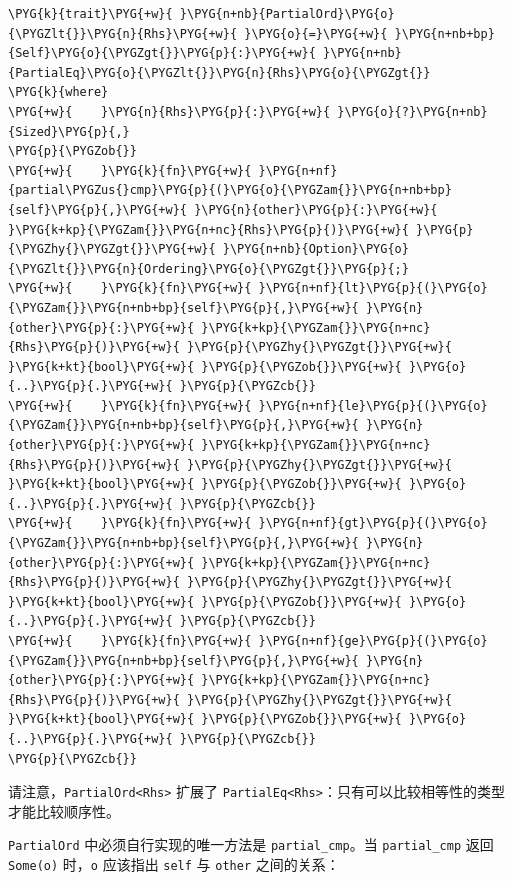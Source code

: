 \begin{Verbatim}[commandchars=\\\{\},breaklines=true,breakanywhere=true,fontsize=\codefont,xleftmargin=17bp]
\PYG{k}{trait}\PYG{+w}{ }\PYG{n+nb}{PartialOrd}\PYG{o}{\PYGZlt{}}\PYG{n}{Rhs}\PYG{+w}{ }\PYG{o}{=}\PYG{+w}{ }\PYG{n+nb+bp}{Self}\PYG{o}{\PYGZgt{}}\PYG{p}{:}\PYG{+w}{ }\PYG{n+nb}{PartialEq}\PYG{o}{\PYGZlt{}}\PYG{n}{Rhs}\PYG{o}{\PYGZgt{}}
\PYG{k}{where}
\PYG{+w}{    }\PYG{n}{Rhs}\PYG{p}{:}\PYG{+w}{ }\PYG{o}{?}\PYG{n+nb}{Sized}\PYG{p}{,}
\PYG{p}{\PYGZob{}}
\PYG{+w}{    }\PYG{k}{fn}\PYG{+w}{ }\PYG{n+nf}{partial\PYGZus{}cmp}\PYG{p}{(}\PYG{o}{\PYGZam{}}\PYG{n+nb+bp}{self}\PYG{p}{,}\PYG{+w}{ }\PYG{n}{other}\PYG{p}{:}\PYG{+w}{ }\PYG{k+kp}{\PYGZam{}}\PYG{n+nc}{Rhs}\PYG{p}{)}\PYG{+w}{ }\PYG{p}{\PYGZhy{}\PYGZgt{}}\PYG{+w}{ }\PYG{n+nb}{Option}\PYG{o}{\PYGZlt{}}\PYG{n}{Ordering}\PYG{o}{\PYGZgt{}}\PYG{p}{;}
\PYG{+w}{    }\PYG{k}{fn}\PYG{+w}{ }\PYG{n+nf}{lt}\PYG{p}{(}\PYG{o}{\PYGZam{}}\PYG{n+nb+bp}{self}\PYG{p}{,}\PYG{+w}{ }\PYG{n}{other}\PYG{p}{:}\PYG{+w}{ }\PYG{k+kp}{\PYGZam{}}\PYG{n+nc}{Rhs}\PYG{p}{)}\PYG{+w}{ }\PYG{p}{\PYGZhy{}\PYGZgt{}}\PYG{+w}{ }\PYG{k+kt}{bool}\PYG{+w}{ }\PYG{p}{\PYGZob{}}\PYG{+w}{ }\PYG{o}{..}\PYG{p}{.}\PYG{+w}{ }\PYG{p}{\PYGZcb{}}
\PYG{+w}{    }\PYG{k}{fn}\PYG{+w}{ }\PYG{n+nf}{le}\PYG{p}{(}\PYG{o}{\PYGZam{}}\PYG{n+nb+bp}{self}\PYG{p}{,}\PYG{+w}{ }\PYG{n}{other}\PYG{p}{:}\PYG{+w}{ }\PYG{k+kp}{\PYGZam{}}\PYG{n+nc}{Rhs}\PYG{p}{)}\PYG{+w}{ }\PYG{p}{\PYGZhy{}\PYGZgt{}}\PYG{+w}{ }\PYG{k+kt}{bool}\PYG{+w}{ }\PYG{p}{\PYGZob{}}\PYG{+w}{ }\PYG{o}{..}\PYG{p}{.}\PYG{+w}{ }\PYG{p}{\PYGZcb{}}
\PYG{+w}{    }\PYG{k}{fn}\PYG{+w}{ }\PYG{n+nf}{gt}\PYG{p}{(}\PYG{o}{\PYGZam{}}\PYG{n+nb+bp}{self}\PYG{p}{,}\PYG{+w}{ }\PYG{n}{other}\PYG{p}{:}\PYG{+w}{ }\PYG{k+kp}{\PYGZam{}}\PYG{n+nc}{Rhs}\PYG{p}{)}\PYG{+w}{ }\PYG{p}{\PYGZhy{}\PYGZgt{}}\PYG{+w}{ }\PYG{k+kt}{bool}\PYG{+w}{ }\PYG{p}{\PYGZob{}}\PYG{+w}{ }\PYG{o}{..}\PYG{p}{.}\PYG{+w}{ }\PYG{p}{\PYGZcb{}}
\PYG{+w}{    }\PYG{k}{fn}\PYG{+w}{ }\PYG{n+nf}{ge}\PYG{p}{(}\PYG{o}{\PYGZam{}}\PYG{n+nb+bp}{self}\PYG{p}{,}\PYG{+w}{ }\PYG{n}{other}\PYG{p}{:}\PYG{+w}{ }\PYG{k+kp}{\PYGZam{}}\PYG{n+nc}{Rhs}\PYG{p}{)}\PYG{+w}{ }\PYG{p}{\PYGZhy{}\PYGZgt{}}\PYG{+w}{ }\PYG{k+kt}{bool}\PYG{+w}{ }\PYG{p}{\PYGZob{}}\PYG{+w}{ }\PYG{o}{..}\PYG{p}{.}\PYG{+w}{ }\PYG{p}{\PYGZcb{}}
\PYG{p}{\PYGZcb{}}
\end{Verbatim}

请注意，\texttt{PartialOrd<Rhs>} 扩展了 \texttt{PartialEq<Rhs>}：只有可以比较相等性的类型才能比较顺序性。

\texttt{PartialOrd} 中必须自行实现的唯一方法是 \texttt{partial\_cmp}。当 \texttt{partial\_cmp} 返回 \texttt{Some(o)} 时，\texttt{o} 应该指出 \texttt{self} 与 \texttt{other} 之间的关系：

